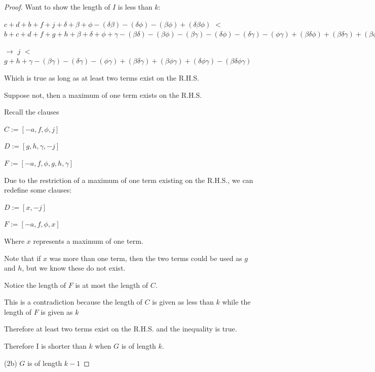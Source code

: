 \documentclass[manuscript]{acmart}
\begin{document}
\begin{proof}
        Want to show the length of $I$ is less than $k$:

        $c + d + b + f + j
        + \delta + \beta + \phi
        - (\delta \beta) - (\delta \phi) - (\beta \phi)
        + (\delta \beta \phi)
        $
        $<$
        $b + c + d + f + g + h
            + \beta + \delta + \phi + \gamma
            - (\beta \delta) - (\beta \phi) - (\beta \gamma) - (\delta \phi) - (\delta \gamma) -(\phi \gamma)
            + (\beta \delta \phi) + (\beta \delta \gamma) + (\beta \phi \gamma) + (\delta \phi \gamma)
            - (\beta \delta \phi \gamma)
        $

        $\rightarrow$
        $j
        $
        $<$
        $g + h
            + \gamma
            - (\beta \gamma) - (\delta \gamma) -(\phi \gamma)
            + (\beta \delta \gamma) + (\beta \phi \gamma) + (\delta \phi \gamma)
            - (\beta \delta \phi \gamma)
        $

        Which is true as long as at least two terms exist on the R.H.S.

        Suppose not, then a maximum of one term exists on the R.H.S.

        Recall the clauses

        $C := [-a, f, \phi, j]$

        $D := [g, h, \gamma, -j]$

        $F := [-a, f, \phi, g, h, \gamma]$

        Due to the restriction of a maximum of one term existing on the R.H.S., we can redefine some clauses:

        $D := [x, -j]$

        $F := [-a, f, \phi, x]$

        Where $x$ represents a maximum of one term.

        Note that if $x$ was more than one term, then the two terms could be used as $g$ and $h$, but we know these do not exist.

        Notice the length of $F$ is at most the length of $C$.

        This is a contradiction because the length of $C$ is given as less than $k$ while the length of $F$ is given as $k$

        Therefore at least two terms exist on the R.H.S. and the inequality is true.

        Therefore I is shorter than $k$ when $G$ is of length $k$.

        (2b) $G$ is of length $k - 1$


\end{proof}
\end{document}
